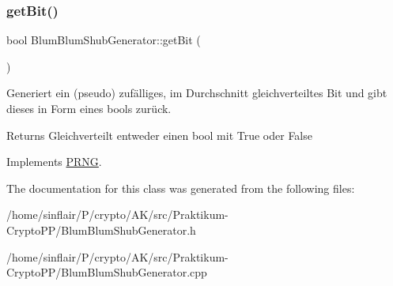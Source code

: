 \subsubsection{\texorpdfstring{get\+Bit()}{getBit()}}
{\footnotesize\ttfamily bool Blum\+Blum\+Shub\+Generator\+::get\+Bit (\begin{DoxyParamCaption}{ }\end{DoxyParamCaption})\hspace{0.3cm}{\ttfamily [virtual]}}

Generiert ein (pseudo) zufälliges, im Durchschnitt gleichverteiltes Bit und gibt dieses in Form eines bools zurück.

\begin{DoxyReturn}{Returns}
Gleichverteilt entweder einen bool mit \textquotesingle{}True\textquotesingle{} oder \textquotesingle{}False\textquotesingle{} 
\end{DoxyReturn}


Implements \hyperlink{classPRNG_a513ec082275e805da358a2a790db2f9e}{P\+R\+NG}.



The documentation for this class was generated from the following files\+:\begin{DoxyCompactItemize}
\item 
/home/sinflair/\+P/crypto/\+A\+K/src/\+Praktikum-\/\+Crypto\+P\+P/Blum\+Blum\+Shub\+Generator.\+h\item 
/home/sinflair/\+P/crypto/\+A\+K/src/\+Praktikum-\/\+Crypto\+P\+P/Blum\+Blum\+Shub\+Generator.\+cpp\end{DoxyCompactItemize}
